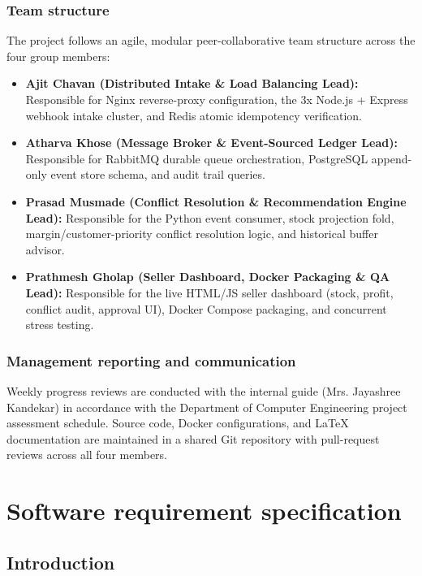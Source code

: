 \documentclass[oneside,a4paper,12pt]{report}
\newcommand{\GuideName}{Mrs. Jayashree Kandekar}
\newcommand{\StudentOneName}{Ajit Chavan}
\newcommand{\StudentTwoName}{Atharva Khose}
\newcommand{\StudentThreeName}{Prasad Musmade}
\newcommand{\StudentFourName}{Prathmesh Gholap}
\begin{document}
\subsection{Team structure}
The project follows an agile, modular peer-collaborative team structure across the four group members:
\begin{itemize}
  \item \textbf{\StudentOneName{} (Distributed Intake \& Load Balancing Lead):} Responsible for Nginx reverse-proxy configuration, the 3x Node.js + Express webhook intake cluster, and Redis atomic idempotency verification.
  \item \textbf{\StudentTwoName{} (Message Broker \& Event-Sourced Ledger Lead):} Responsible for RabbitMQ durable queue orchestration, PostgreSQL append-only event store schema, and audit trail queries.
  \item \textbf{\StudentThreeName{} (Conflict Resolution \& Recommendation Engine Lead):} Responsible for the Python event consumer, stock projection fold, margin/customer-priority conflict resolution logic, and historical buffer advisor.
  \item \textbf{\StudentFourName{} (Seller Dashboard, Docker Packaging \& QA Lead):} Responsible for the live HTML/JS seller dashboard (stock, profit, conflict audit, approval UI), Docker Compose packaging, and concurrent stress testing.
\end{itemize}

\subsection{Management reporting and communication}
Weekly progress reviews are conducted with the internal guide (\GuideName) in accordance with the Department of Computer Engineering project assessment schedule. Source code, Docker configurations, and LaTeX documentation are maintained in a shared Git repository with pull-request reviews across all four members.

\chapter{Software requirement specification}

\section{Introduction}
\end{document}
